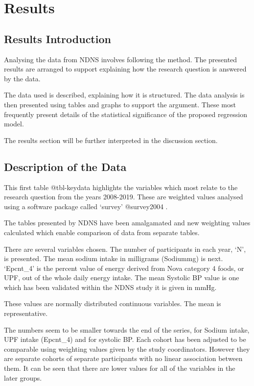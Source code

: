 \documentclass[
]{article}
\begin{document}
\newpage

\hypertarget{results}{%
\section{Results}\label{results}}

\hypertarget{results-introduction}{%
\subsection{Results Introduction}\label{results-introduction}}

Analysing the data from NDNS involves following the method. The
presented results are arranged to support explaining how the research
question is answered by the data.

The data used is described, explaining how it is structured. The data
analysis is then presented using tables and graphs to support the
argument. These most frequently present details of the statistical
significance of the proposed regression model.

The results section will be further interpreted in the discussion
section.

\hypertarget{description-of-the-data-1}{%
\subsection{Description of the Data}\label{description-of-the-data-1}}

This first table @tbl-keydata highlights the variables which most relate
to the research question from the years 2008-2019. These are weighted
values analysed using a software package called `survey' @survey2004 .

The tables presented by NDNS have been amalgamated and new weighting
values calculated which enable comparison of data from separate tables.

There are several variables chosen. The number of participants in each
year, `N', is presented. The mean sodium intake in milligrams (Sodiummg)
is next. `Epcnt\_4' is the percent value of energy derived from Nova
category 4 foods, or UPF, out of the whole daily energy intake. The mean
Systolic BP value is one which has been validated within the NDNS study
it is given in mmHg.

These values are normally distributed continuous variables. The mean is
representative.

The numbers seem to be smaller towards the end of the series, for Sodium
intake, UPF intake (Epcnt\_4) and for systolic BP. Each cohort has been
adjusted to be comparable using weighting values given by the study
coordinators. However they are separate cohorts of separate participants
with no linear association between them. It can be seen that there are
lower values for all of the variables in the later groups.
\end{document}
